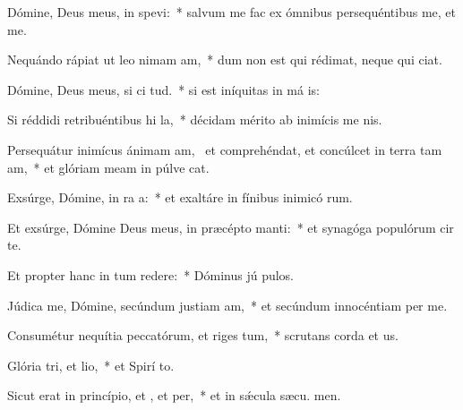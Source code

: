 \item Dómine, Deus meus, in  spevi:~* salvum me fac ex ómnibus persequéntibus me, et  me.
\item Nequándo rápiat ut leo nimam am,~* dum non est qui rédimat, neque qui  ciat.
\item Dómine, Deus meus, si ci tud.~* si est iníquitas in má is:
\item Si réddidi retribuéntibus hi la,~* décidam mérito ab inimícis me nis.
\item Persequátur inimícus ánimam am,~\pscross{} et comprehéndat, et concúlcet in terra tam am,~* et glóriam meam in púlve cat.
\item Exsúrge, Dómine, in ra a:~* et exaltáre in fínibus inimicó rum.
\item Et exsúrge, Dómine Deus meus, in præcépto  manti:~* et synagóga populórum cir te.
\item Et propter hanc in tum redere:~* Dóminus jú pulos.
\item Júdica me, Dómine, secúndum justiam am,~* et secúndum innocéntiam  per me.
\item Consumétur nequítia peccatórum, et riges tum,~* scrutans corda et  us.
\item Glória tri, et lio,~* et Spirí to.
\item Sicut erat in princípio, et , et per,~* et in sǽcula sæcu. men.
